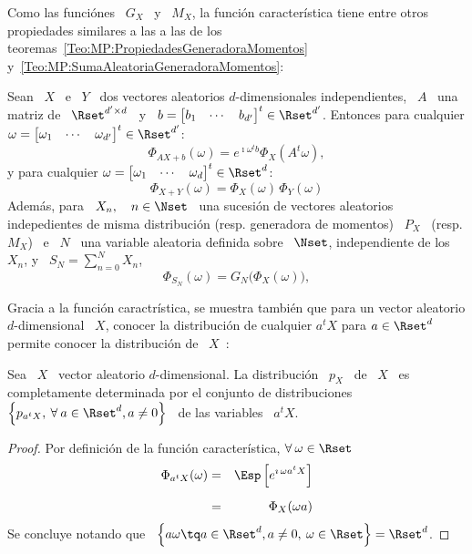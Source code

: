 {Como las  funci\'ones \ $G_X$ \  y \ $M_X$, la  funci\'on caracter\'istica tiene
entre    otros    propiedades    similares     a    las    a    las    de    los
teoremas~\ref{Teo:MP:PropiedadesGeneradoraMomentos}
y~\ref{Teo:MP:SumaAleatoriaGeneradoraMomentos}:
%
\begin{teorema}%
\label{Teo:MP:PropiedadesFuncionCaracteristica}
%
  Sean  \   $X$  \  e  \   $Y$  \  dos   vectores  aleatorios  $d$-dimensionales
  independientes,  \ $A$  \ una  matriz de  \  $\Rset^{d' \times  d}$ \  y \  $b
  =  \begin{bmatrix} b_1  &  \cdots &  b_{d'}  \end{bmatrix}^t \in  \Rset^{d'}$.
  Entonces  para  cualquier  $\omega  =  \begin{bmatrix}  \omega_1  &  \cdots  &
    \omega_{d'} \end{bmatrix}^t \in \Rset^{d'}$:
  \[
  \Phi_{A X + b}(\omega) =  e^{\imath \omega^t b} \Phi_X\left( A^t \omega \right),
  \]
  y   para   cualquier  $\omega   =   \begin{bmatrix}   \omega_1   &  \cdots   &
    \omega_d \end{bmatrix}^t \in \Rset^d$:
  \[
  \Phi_{X+Y}(\omega) = \Phi_X(\omega) \, \Phi_Y(\omega)
  \]
  Adem\'as,  para \  $X_n, \quad  n  \in \Nset$  \, una  sucesi\'on de  vectores
  aleatorios  indepedientes  de   misma  distribuci\'on  (resp.   generadora  de
  momentos) \ $P_X$ \ (resp. $M_X$) \  e \ $N$ \ una variable aleatoria definida
  sobre \ $\Nset$, independiente de los \ $X_n$, y \ $ S_N = \sum_{n=0}^N X_n$,
  \[
  \Phi_{S_N}(\omega) =  G_N \big( \Phi_X(\omega) \big),
  \]
\end{teorema}

Gracia a la  funci\'on caractr\'istica, se muestra tambi\'en  que para un vector
aleatorio $d$-dimensional \ $X$, conocer  la distribuci\'on de cualquier $a^t X$
para $a  \in \Rset^d$  permite conocer la  distribuci\'on de  \ $X$~\cite{Mui82,
  Sas13}:
%
\begin{teorema}
  Sea \ $X$ \ vector aleatorio $d$-dimensional. La distribuci\'on \ $p_X$ \ de \
  $X$  \  es completamente  determinada  por  el  conjunto de  distribuciones  \
  $\left\{ p_{a^t X},  \: \forall \: a \in  \Rset^d, a \ne 0 \right\}$  \ de las
  variables \ $a^t X$.
\end{teorema}
%
\begin{proof}
  Por definici\'on  de la funci\'on caracter\'istica, $\forall \: \omega \in \Rset$
  \begin{eqnarray*}
  \Phi_{a^t X}(\omega) & = & \Esp\left[ e^{\imath \, \omega a^t X} \right]\\[2mm]
  & = & \Phi_X(\omega a)
  \end{eqnarray*}
  Se concluye  notando que \ $\left\{  a \omega \tq a  \in \Rset^d, a  \ne 0, \:
    \omega \in \Rset \right\} = \Rset^d$.
\end{proof}

}
